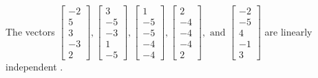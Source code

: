 \begin{exercise}
\begin{exerciseStatement}
  \end{exerciseStatement}
  \begin{exerciseAnswer}
   The vectors \(\left[\begin{array}{r}
-2 \\
5 \\
3 \\
-3 \\
2
\end{array}\right] , \left[\begin{array}{r}
3 \\
-5 \\
-3 \\
1 \\
-5
\end{array}\right] , \left[\begin{array}{r}
1 \\
-5 \\
-5 \\
-4 \\
-4
\end{array}\right] , \left[\begin{array}{r}
2 \\
-4 \\
-4 \\
-4 \\
2
\end{array}\right] , \text{ and } \left[\begin{array}{r}
-2 \\
-5 \\
4 \\
-1 \\
3
\end{array}\right]\) are 
  	 linearly independent  .
  


  \end{exerciseAnswer}
\end{exercise}